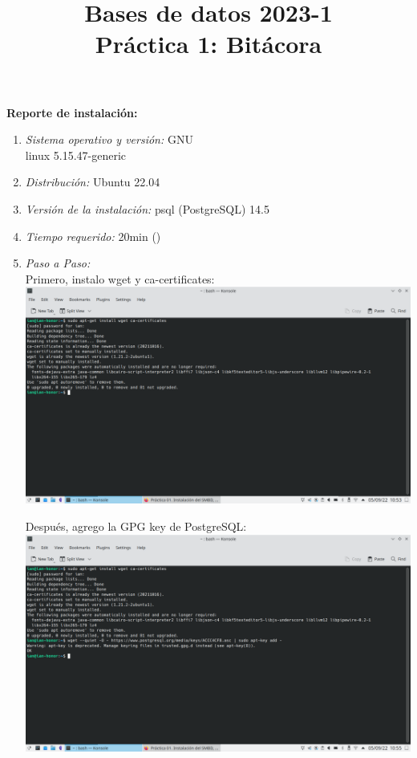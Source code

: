 \documentclass[12pt,a4paper]{article}
\title{Bases de datos 2023-1\\
Práctica 1: Bitácora}
\begin{document}
\maketitle

\textbf{Reporte de instalación:}\\
\begin{enumerate}
    \item \textit{Sistema operativo y versión:} GNU\\linux 5.15.47-generic \\

    \item \textit{Distribución:} Ubuntu 22.04\\

    \item \textit{Versión de la instalación:} psql (PostgreSQL) 14.5\\

    \item \textit{Tiempo requerido:} 20min ()\\

    \item \textit{Paso a Paso:}\\
    
        Primero, instalo wget y ca-certificates: \\
        \includegraphics[scale=0.3]{assets/ian_0.png}

        Después, agrego la GPG key de PostgreSQL: \\
        \includegraphics[scale=0.3]{assets/ian_1.png}\\
        

\end{enumerate}
\end{document}
